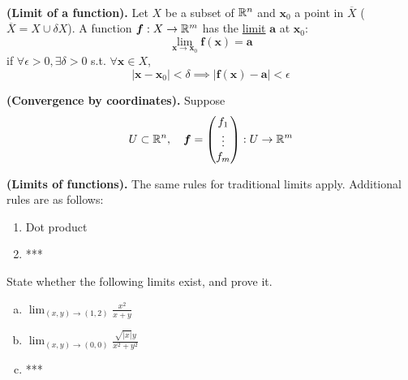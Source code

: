 \\

\begin{defn}
\textbf{(Limit of a function).} Let $X$ be a subset of $\mathbb{R}^n$ and $\bm{x}_0$ a point in $\overline{X}$ ($\overline{X}=X\cup \delta X$). A function $\bm{f} : X \rightarrow \mathbb{R}^m$ has the \ul{limit}
 $\bm{a}$ at $\bm{x}_0$:
\[\lim_{\bm{x}\rightarrow \bm{x}_0}\bm{f}(\bm{x}) = \bm{a}\]
if $\forall \epsilon > 0, \exists\delta > 0$ s.t. $\forall\bm{x}\in X$,
\[|\bm{x}-\bm{x}_0|<\delta \implies |\bm{f}(\bm{x})-\bm{a}|<\epsilon\]
\end{defn}

\begin{proposition}
\textbf{(Convergence by coordinates).} Suppose
\[U\subset \mathbb{R}^n, \quad \bm{f}=\begin{pmatrix} f_1 \\ \vdots \\ f_m \end{pmatrix}: U\rightarrow \mathbb{R}^m\]
\end{proposition}

\begin{theorem}
  \textbf{(Limits of functions).} The same rules for traditional limits apply. Additional rules are as follows:
  \begin{enumerate}
    \item Dot product
    \item ***
  \end{enumerate}
\end{theorem}

 State whether the following limits exist, and prove it.
\begin{enumerate}[a.]
  \item $\displaystyle \lim_{(x,y)\rightarrow (1,2)} \frac{x^2}{x+y}$
  
  \item $\displaystyle \lim_{(x,y)\rightarrow (0,0)} \frac{\sqrt{|x|}y}{x^2+y^2}$
  \item ***

\end{enumerate}
